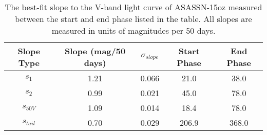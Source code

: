\begin{table*}
\centering
\caption{The best-fit slope to the V-band light curve of ASASSN-15oz measured between the start and end phase listed in the table. All slopes are measured in units of magnitudes per 50 days.}
\begin{tabular}{ccccc}
Slope Type & Slope (mag/50 days) & $\sigma_{slope}$ & Start Phase & End Phase \\
\hline
$s_1$ & 1.21 & 0.066 & 21.0 & 38.0 \\
$s_2$ & 0.99 & 0.021 & 45.0 & 78.0 \\
$s_{50V}$ & 1.09 & 0.014 & 18.4 & 78.0 \\
$s_{tail}$ & 0.70 & 0.029 & 206.9 & 368.0 \\
\end{tabular}
\end{table*}
